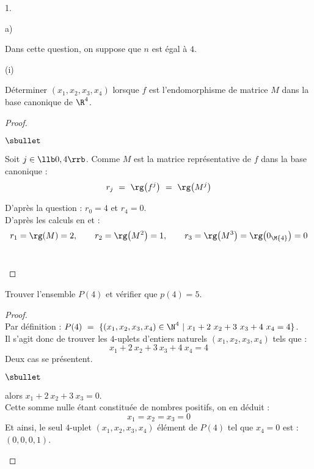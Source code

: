\documentclass[11pt]{article}%
\begin{document}
\begin{noliste}{1.}
\begin{noliste}{a)}
    \newpage


  \item Dans cette question, on suppose que $n$ est égal à $4$.
  \end{noliste}
    \begin{noliste}{(i)}
    \item Déterminer $(x_1,x_2,x_3,x_4)$ lorsque $f$ est
      l'endomorphisme de matrice $M$ dans la base canonique
      \nolinebreak de $\R^4$.

      \begin{proof}~%
        \begin{noliste}{$\sbullet$}
        \item Soit $j \in \llb 0, 4 \rrb$. Comme $M$ est la matrice
          représentative de $f$ dans la base canonique :
          \[
          r_j \ = \ \rg\big( f^j \big) \ = \ \rg\big( M^j \big)
          \]

        \item D'après la question  : $r_0 = 4$ et $r_4 = 0$.\\
          D'après les calculs en  et  :
          \[
          r_1 = \rg(M) = 2, \qquad r_2 = \rg\big( M^2 \big) = 1,
          \qquad r_3 = \rg\big( M^3 \big) = \rg\big( 0_{\M{4}} \big) =
          0
          \]
          ~\\[-1.2cm]
        \end{noliste}
      \end{proof}
      
    \item Trouver l'ensemble $P(4)$ et vérifier que $p(4)=5$.
    \end{noliste}

    \begin{proof}~\\%
      Par définition : $P(4) \ = \ \{ (x_1, x_2, x_3, x_4) \in \N^4 \
      | \ x_1 + 2 \ x_2 + 3 \ x_3 + 4 \ x_4 = 4\}$.\\
      Il s'agit donc de trouver les $4$-uplets d'entiers naturels
      $(x_1, x_2, x_3, x_4)$ tels que : 
      \[
      x_1 + 2 \ x_2 + 3 \ x_3 + 4 \ x_4 = 4
      \]
      Deux cas se présentent.
      \begin{noliste}{$\sbullet$}
      \item {} alors $x_1 + 2 \ x_2 + 3 \ x_3 =
        0$.\\
        Cette somme nulle étant constituée de nombres positifs, on en
        déduit :
        \[
        x_1 = x_2 = x_3 = 0
        \]
        Et ainsi, le seul $4$-uplet $(x_1, x_2, x_3, x_4)$ élément de
        $P(4)$ tel que $x_4 = 0$ est : $(0, 0, 0, 1)$.


\end{noliste}
\end{proof}
\end{noliste}
\end{document}
